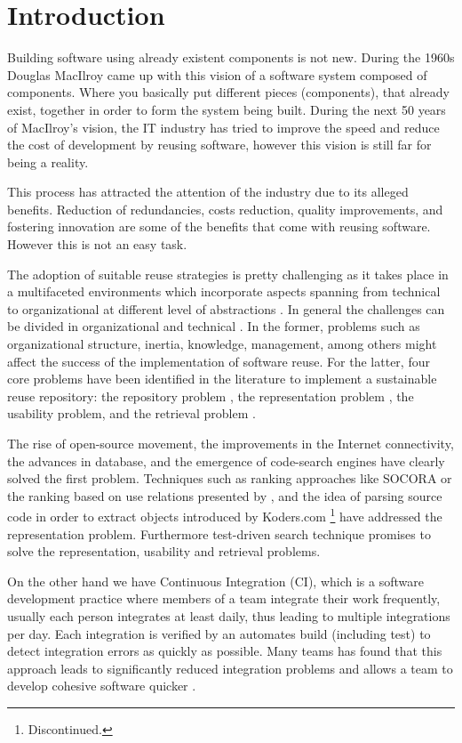 \chapter{Introduction}
\label{chap:introduction}
Building software using already existent components is not new. During the 1960s Douglas MacIlroy came up with this vision of a software system composed of components. Where you basically put different pieces (components), that already exist, together in order to form the system being built. During the next 50 years of MacIlroy's vision, the IT industry has tried to improve the speed and reduce the cost of development by reusing software, however this vision is still far for being a reality.

This process has attracted the attention of the industry due to its alleged benefits. Reduction of redundancies, costs reduction, quality improvements, and fostering innovation are some of the benefits that come with reusing software. However this is not an easy task.

The adoption of suitable reuse strategies is pretty challenging as it takes place in a multifaceted environments which incorporate aspects spanning from technical to organizational at different level of abstractions \cite{Bauer2016}. In general the challenges can be divided in organizational and technical \cite{Hummel2013,Bauer2016}. In the former, problems such as organizational structure, inertia, knowledge, management, among others might affect the success of the implementation of software reuse. For the latter, four core problems have been identified in the literature to implement a sustainable reuse repository: the repository problem \cite{Seacord1999}, the representation problem \cite{Pole1994}, the usability problem\cite{Garcia2006}, and the retrieval problem \cite{Prieto-Diaz1987}.

The rise of open-source movement, the improvements in the Internet connectivity, the advances in database, and the emergence of code-search engines have clearly solved the first problem. Techniques such as ranking approaches like SOCORA \cite{Kessel2016} or the ranking based on use relations presented by \citeauthor{Inoue2005}, and the idea of parsing source code in order to extract objects introduced by Koders.com \footnote{Discontinued.} have addressed the representation problem. Furthermore test-driven search technique \cite{Hummel2004,Hummel2013} promises to solve the representation, usability and retrieval problems.

On the other hand we have Continuous Integration (CI), which is a software development practice where members of a team integrate their work frequently, usually each person integrates at least daily, thus leading to multiple integrations per day. Each integration is verified by an automates build (including test) to detect integration errors as quickly as possible. Many teams has found that this approach leads to significantly reduced integration problems and allows a team to develop cohesive software quicker \cite{Fowler2006}.

